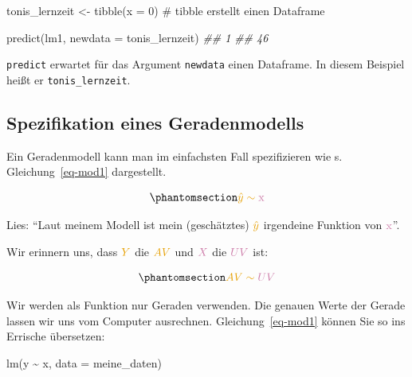 \documentclass[
  letterpaper,
  twoside,
  open=any]{scrbook}
\newenvironment{Shaded}{\begin{snugshade}}{\end{snugshade}}
\newcommand{\AttributeTok}[1]{\textcolor[rgb]{0.40,0.45,0.13}{#1}}
\newcommand{\CommentTok}[1]{\textcolor[rgb]{0.37,0.37,0.37}{#1}}
\newcommand{\DecValTok}[1]{\textcolor[rgb]{0.68,0.00,0.00}{#1}}
\newcommand{\DocumentationTok}[1]{\textcolor[rgb]{0.37,0.37,0.37}{\textit{#1}}}
\newcommand{\FunctionTok}[1]{\textcolor[rgb]{0.28,0.35,0.67}{#1}}
\newcommand{\NormalTok}[1]{\textcolor[rgb]{0.00,0.23,0.31}{#1}}
\newcommand{\OtherTok}[1]{\textcolor[rgb]{0.00,0.23,0.31}{#1}}
\newcommand{\SpecialCharTok}[1]{\textcolor[rgb]{0.37,0.37,0.37}{#1}}
\theoremstyle{definition}
\theoremstyle{definition}
\theoremstyle{definition}
\theoremstyle{remark}
\begin{document}
\begin{Shaded}
\begin{Highlighting}[]
\NormalTok{tonis\_lernzeit }\OtherTok{\textless{}{-}} \FunctionTok{tibble}\NormalTok{(}\AttributeTok{x =} \DecValTok{0}\NormalTok{)  }\CommentTok{\# \textasciigrave{}tibble\textasciigrave{} erstellt einen Dataframe}
\end{Highlighting}
\end{Shaded}

\begin{Shaded}
\begin{Highlighting}[]
\FunctionTok{predict}\NormalTok{(lm1, }\AttributeTok{newdata =}\NormalTok{ tonis\_lernzeit)}
\DocumentationTok{\#\#  1 }
\DocumentationTok{\#\# 46}
\end{Highlighting}
\end{Shaded}

\texttt{predict} erwartet für das Argument \texttt{newdata} einen
Dataframe. In diesem Beispiel heißt er \texttt{tonis\_lernzeit}.

\subsection{Spezifikation eines
Geradenmodells}\label{spezifikation-eines-geradenmodells}

Ein Geradenmodell kann man im einfachsten Fall spezifizieren wie s.
Gleichung~\ref{eq-mod1} dargestellt.

\begin{equation}\phantomsection\label{eq-mod1}{\color{ycol}{\hat{y}} \sim \color{xcol}{\text{x}}}\end{equation}

Lies: \enquote{Laut meinem Modell ist mein (geschätztes)
\(\color{ycol}{\hat{y}}\) irgendeine Funktion von
\(\color{xcol}{\text{x}}\)}.

Wir erinnern uns, dass \(\color{ycol}{Y}\) die \(\color{ycol}{AV}\) und
\(\color{xcol}{X}\) die \(\color{xcol}{UV}\) ist:

\begin{equation}\phantomsection\label{eq-mod1}{\color{ycol}{AV} \sim \color{xcol}{UV}}\end{equation}

Wir werden als Funktion nur Geraden verwenden. Die genauen Werte der
Gerade lassen wir uns vom Computer ausrechnen. Gleichung~\ref{eq-mod1}
können Sie so ins Errische übersetzen:

\begin{Shaded}
\begin{Highlighting}[]
\FunctionTok{lm}\NormalTok{(y }\SpecialCharTok{\textasciitilde{}}\NormalTok{ x, }\AttributeTok{data =}\NormalTok{ meine\_daten)}
\end{Highlighting}
\end{Shaded}
\end{document}
